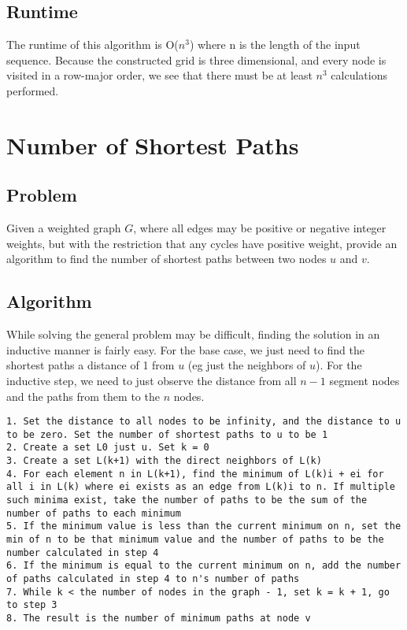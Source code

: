\documentclass[titlepage]{article}
\begin{document}
\subsection{Runtime}
The runtime of this algorithm is O($n^3$) where n is the length of the input sequence. Because the constructed grid is three dimensional, and every
node is visited in a row-major order, we see that there must be at least $n^3$ calculations performed. 

\section{Number of Shortest Paths}
\subsection{Problem}
Given a weighted graph $G$, where all edges may be positive or negative integer weights, but with the restriction that any cycles have
positive weight, provide an algorithm to find the number of shortest paths between two nodes $u$ and $v$.
\subsection{Algorithm}
While solving the general problem may be difficult, finding the solution in an inductive manner is fairly easy. For the base case, we just
need to find the shortest paths a distance of 1 from $u$ (eg just the neighbors of $u$). For the inductive step, we need to just observe
the distance from all $n-1$ segment nodes and the paths from them to the $n$ nodes.
\begin{lstlisting}
1. Set the distance to all nodes to be infinity, and the distance to u to be zero. Set the number of shortest paths to u to be 1
2. Create a set L0 just u. Set k = 0
3. Create a set L(k+1) with the direct neighbors of L(k)
4. For each element n in L(k+1), find the minimum of L(k)i + ei for all i in L(k) where ei exists as an edge from L(k)i to n. If multiple such minima exist, take the number of paths to be the sum of the number of paths to each minimum
5. If the minimum value is less than the current minimum on n, set the min of n to be that minimum value and the number of paths to be the number calculated in step 4
6. If the minimum is equal to the current minimum on n, add the number of paths calculated in step 4 to n's number of paths
7. While k < the number of nodes in the graph - 1, set k = k + 1, go to step 3
8. The result is the number of minimum paths at node v
\end{lstlisting}
\end{document}
